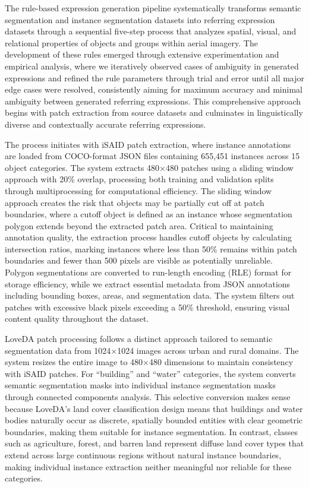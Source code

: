 The rule-based expression generation pipeline systematically transforms semantic segmentation and instance segmentation datasets into referring expression datasets through a sequential five-step process that analyzes spatial, visual, and relational properties of objects and groups within aerial imagery. The development of these rules emerged through extensive experimentation and empirical analysis, where we iteratively observed cases of ambiguity in generated expressions and refined the rule parameters through trial and error until all major edge cases were resolved, consistently aiming for maximum accuracy and minimal ambiguity between generated referring expressions. This comprehensive approach begins with patch extraction from source datasets and culminates in linguistically diverse and contextually accurate referring expressions.

The process initiates with iSAID patch extraction, where instance annotations are loaded from COCO-format JSON files containing 655,451 instances across 15 object categories. The system extracts 480$\times$480 patches using a sliding window approach with 20\% overlap, processing both training and validation splits through multiprocessing for computational efficiency. The sliding window approach creates the risk that objects may be partially cut off at patch boundaries, where a cutoff object is defined as an instance whose segmentation polygon extends beyond the extracted patch area. Critical to maintaining annotation quality, the extraction process handles cutoff objects by calculating intersection ratios, marking instances where less than 50\% remains within patch boundaries and fewer than 500 pixels are visible as potentially unreliable. Polygon segmentations are converted to run-length encoding (RLE) format for storage efficiency, while we extract essential metadata from JSON annotations including bounding boxes, areas, and segmentation data. The system filters out patches with excessive black pixels exceeding a 50\% threshold, ensuring visual content quality throughout the dataset.

LoveDA patch processing follows a distinct approach tailored to semantic segmentation data from 1024$\times$1024 images across urban and rural domains. The system resizes the entire image to 480$\times$480 dimensions to maintain consistency with iSAID patches. For ``building'' and ``water'' categories, the system converts semantic segmentation masks into individual instance segmentation masks through connected components analysis. This selective conversion makes sense because LoveDA's land cover classification design means that buildings and water bodies naturally occur as discrete, spatially bounded entities with clear geometric boundaries, making them suitable for instance segmentation. In contrast, classes such as agriculture, forest, and barren land represent diffuse land cover types that extend across large continuous regions without natural instance boundaries, making individual instance extraction neither meaningful nor reliable for these categories.

